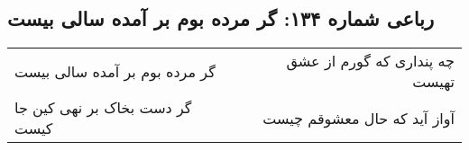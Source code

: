\begin{center}
\section*{رباعی شماره ۱۳۴: گر مرده بوم بر آمده سالی بیست}
\label{sec:sh134}
\begin{longtable}{l p{0.5cm} r}
گر مرده بوم بر آمده سالی بیست
&&
چه پنداری که گورم از عشق تهیست
\\
گر دست بخاک بر نهی کین جا کیست
&&
آواز آید که حال معشوقم چیست
\\
\end{longtable}
\end{center}

